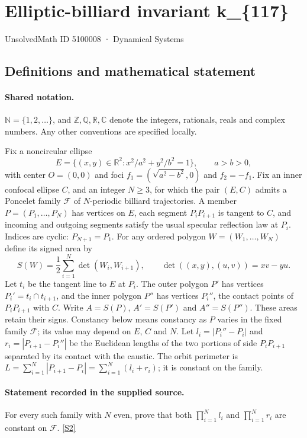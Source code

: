 \documentclass[11pt]{article}
\newcommand{\sref}[2]{\hyperlink{source:#1:#2}{[S#2]}}
\begin{document}
\setcounter{section}{5100007}
\section{Elliptic-billiard invariant k\_\{117\}}\label{5100008}
{\small\sffamily UnsolvedMath ID 5100008 · Dynamical Systems}
\subsection{Definitions and mathematical statement}

\paragraph{Shared notation.}$\mathbb N=\{1,2,\ldots\}$, and $\mathbb Z,\mathbb Q,\mathbb R,\mathbb C$ denote the integers, rationals, reals and complex numbers. Any other conventions are specified locally.


Fix a noncircular ellipse
\[
E=\{(x,y)\in\mathbb R^2:x^2/a^2+y^2/b^2=1\},\qquad a>b>0,
\]
with center $O=(0,0)$ and foci $f_1=(\sqrt{a^2-b^2},0)$ and $f_2=-f_1$. Fix an inner confocal ellipse $C$, and an integer $N\geq3$, for which the pair $(E,C)$ admits a Poncelet family $\mathcal F$ of $N$-periodic billiard trajectories. A member $P=(P_1,\ldots,P_N)$ has vertices on $E$, each segment $P_iP_{i+1}$ is tangent to $C$, and incoming and outgoing segments satisfy the usual specular reflection law at $P_i$. Indices are cyclic: $P_{N+1}=P_1$.
For any ordered polygon $W=(W_1,\ldots,W_N)$ define its signed area by
\[
S(W)=\frac12\sum_{i=1}^N\det(W_i,W_{i+1}),\qquad
\det((x,y),(u,v))=xv-yu.
\]
Let $t_i$ be the tangent line to $E$ at $P_i$. The outer polygon $P'$ has vertices $P_i'=t_i\cap t_{i+1}$, and the inner polygon $P''$ has vertices $P_i''$, the contact points of $P_iP_{i+1}$ with $C$. Write $A=S(P)$, $A'=S(P')$ and $A''=S(P'')$. These areas retain their signs. Constancy below means constancy as $P$ varies in the fixed family $\mathcal F$; its value may depend on $E$, $C$ and $N$.
Let $l_i=|P_i''-P_i|$ and $r_i=|P_{i+1}-P_i''|$ be the Euclidean lengths of the two portions of side $P_iP_{i+1}$ separated by its contact with the caustic. The orbit perimeter is $L=\sum_{i=1}^N|P_{i+1}-P_i|=\sum_{i=1}^N(l_i+r_i)$; it is constant on the family.
\paragraph{Statement recorded in the supplied source.}
For every such family with $N$ even, prove that both $\displaystyle\prod_{i=1}^N l_i$ and $\displaystyle\prod_{i=1}^N r_i$ are constant on $\mathcal F$. \sref{5100008}{2}
\end{document}
